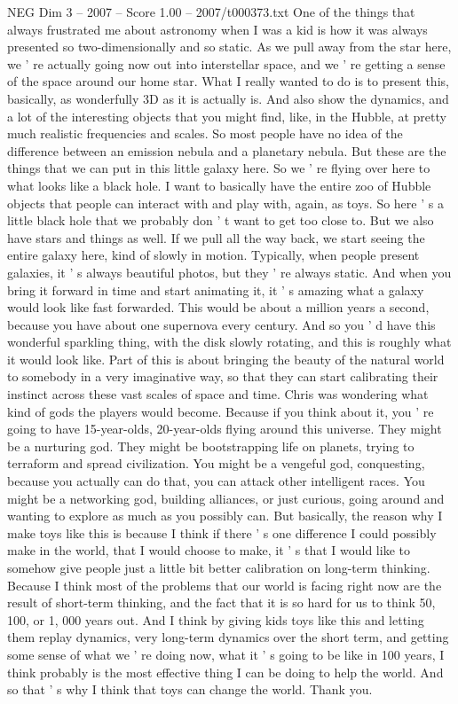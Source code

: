 \begin{textsample}{NEG Dim 3 – 2007 – Score 1.00 – 2007/t000373.txt}
One of the things that always frustrated me about astronomy when I was a kid is how it was always presented so two-dimensionally and so static.
As we pull away from the star here, we ' re actually going now out into interstellar space, and we ' re getting a sense of the space around our home star.
What I really wanted to do is to present this, basically, as wonderfully 3D as it is actually is.
And also show the dynamics, and a lot of the interesting objects that you might find, like, in the Hubble, at pretty much realistic frequencies and scales.
So most people have no idea of the difference between an emission nebula and a planetary nebula.
But these are the things that we can put in this little galaxy here.
So we ' re flying over here to what looks like a black hole.
I want to basically have the entire zoo of Hubble objects that people can interact with and play with, again, as toys.
So here ' s a little black hole that we probably don ' t want to get too close to.
But we also have stars and things as well.
If we pull all the way back, we start seeing the entire galaxy here, kind of slowly in motion.
Typically, when people present galaxies, it ' s always beautiful photos, but they ' re always static.
And when you bring it forward in time and start animating it, it ' s amazing what a galaxy would look like fast forwarded.
This would be about a million years a second, because you have about one supernova every century.
And so you ' d have this wonderful sparkling thing, with the disk slowly rotating, and this is roughly what it would look like.
Part of this is about bringing the beauty of the natural world to somebody in a very imaginative way, so that they can start calibrating their instinct across these vast scales of space and time.
Chris was wondering what kind of gods the players would become.
Because if you think about it, you ' re going to have 15-year-olds, 20-year-olds flying around this universe.
They might be a nurturing god.
They might be bootstrapping life on planets, trying to terraform and spread civilization.
You might be a vengeful god, conquesting, because you actually can do that, you can attack other intelligent races.
You might be a networking god, building alliances, or just curious, going around and wanting to explore as much as you possibly can.
But basically, the reason why I make toys like this is because I think if there ' s one difference I could possibly make in the world, that I would choose to make, it ' s that I would like to somehow give people just a little bit better calibration on long-term thinking.
Because I think most of the problems that our world is facing right now are the result of short-term thinking, and the fact that it is so hard for us to think 50, 100, or 1, 000 years out.
And I think by giving kids toys like this and letting them replay dynamics, very long-term dynamics over the short term, and getting some sense of what we ' re doing now, what it ' s going to be like in 100 years, I think probably is the most effective thing I can be doing to help the world.
And so that ' s why I think that toys can change the world.
Thank you.

\end{textsample}
